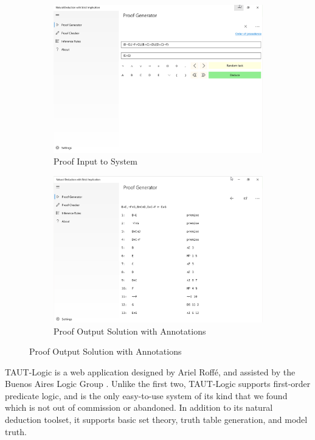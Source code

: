 \documentclass[ms]{uncgdissertationexp2}
\theoremstyle{plain}
\theoremstyle{definition}
\theoremstyle{remark}
\begin{document}
\begin{figure}[!ht]
	\centering
	\caption{NaturalDeduction Windows Application Solving a Proof}
	\label{fig:test}
	\begin{subfigure}{.5\textwidth}
		\centering
		\includegraphics[width=0.9\linewidth]{w10app-1.png}
		\caption{Proof Input to System}
		\label{fig:sub1}
	\end{subfigure}%
	\begin{subfigure}{.5\textwidth}
		\centering
		\includegraphics[width=0.9\linewidth]{w10app-2.png}
		\caption{Proof Output Solution with Annotations}
		\label{fig:sub2}
	\end{subfigure}
\end{figure}

TAUT-Logic is a web application designed by Ariel Roff\'e, and assisted by the Buenos Aires Logic Group \cite{taut}. Unlike the first two, TAUT-Logic supports first-order predicate logic, and is the only easy-to-use system of its kind that we found which is not out of commission or abandoned. In addition to its natural deduction toolset, it supports basic set theory,  truth table generation, and model truth. 
\end{document}
